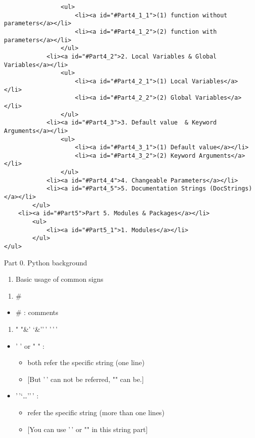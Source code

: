 \documentclass[11pt]{article}
\providecommand{\tightlist}{%
      \setlength{\itemsep}{0pt}\setlength{\parskip}{0pt}}
\begin{document}
\begin{verbatim}
                <ul>
                    <li><a id="#Part4_1_1">(1) function without parameters</a></li>
                    <li><a id="#Part4_1_2">(2) function with parameters</a></li>
                </ul>
            <li><a id="#Part4_2">2. Local Variables & Global Variables</a></li>
                <ul>
                    <li><a id="#Part4_2_1">(1) Local Variables</a></li>
                    <li><a id="#Part4_2_2">(2) Global Variables</a></li>
                </ul>
            <li><a id="#Part4_3">3. Default value  & Keyword Arguments</a></li>
                <ul>
                    <li><a id="#Part4_3_1">(1) Default value</a></li>
                    <li><a id="#Part4_3_2">(2) Keyword Arguments</a></li>
                </ul>
            <li><a id="#Part4_4">4. Changeable Parameters</a></li>
            <li><a id="#Part4_5">5. Documentation Strings (DocStrings)</a></li>
        </ul>
    <li><a id="#Part5">Part 5. Modules & Packages</a></li>   
        <ul>
            <li><a id="#Part5_1">1. Modules</a></li>
        </ul>
</ul>
\end{verbatim}

    Part 0. Python background

    \begin{enumerate}
\def\labelenumi{\arabic{enumi}.}
\tightlist
\item
  Basic usage of common signs
\end{enumerate}

    \begin{enumerate}
\def\labelenumi{(\arabic{enumi})}
\tightlist
\item
  \#
\end{enumerate}

    \begin{itemize}
\tightlist
\item
  \# : comments
\end{itemize}

    \begin{enumerate}
\def\labelenumi{(\arabic{enumi})}
\setcounter{enumi}{1}
\tightlist
\item
  " "\&' `\&''\,' '\,'\,'
\end{enumerate}

    \begin{itemize}
\tightlist
\item
  ' ' or " " :

  \begin{itemize}
  \tightlist
  \item
    both refer the specific string (one line)
  \item
    {[}But '\,' can not be referred, "" can be.{]}
  \end{itemize}
\item
  '\,'`\ldots{}''\,' :

  \begin{itemize}
  \tightlist
  \item
    refer the specific string (more than one lines)
  \item
    {[}You can use '\,' or "" in this string part{]}
  \end{itemize}
\end{itemize}
\end{document}
